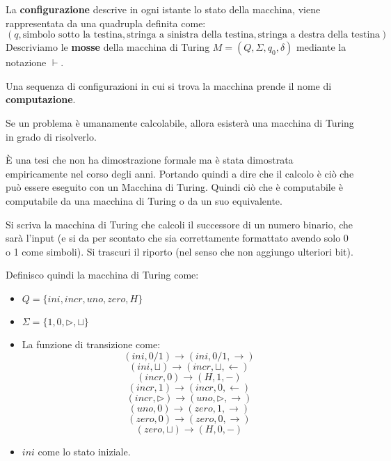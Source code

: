La \textbf{configurazione} descrive in ogni istante lo stato della macchina, viene rappresentata da una quadrupla definita come:
\begin{equation}
    (q, \text{simbolo sotto la testina}, \text{stringa a sinistra della testina}, \text{stringa a destra della testina})
\end{equation}
Descriviamo le \textbf{mosse} della macchina di Turing $M = (Q, \Sigma, q_0, \delta)$ mediante la notazione $\vdash$. 
\begin{definizione}
    Una sequenza di configurazioni in cui si trova la macchina prende il nome di \textbf{computazione}.
\end{definizione}
\begin{teorema}
    Se un problema è umanamente calcolabile, allora esisterà una macchina di Turing in grado di risolverlo.
\end{teorema}
È una tesi che non ha dimostrazione formale ma è stata dimostrata empiricamente nel corso degli anni. Portando quindi a dire che il calcolo è ciò che può essere eseguito con un Macchina di Turing. Quindi ciò che è computabile è computabile da una macchina di Turing o da un suo equivalente.

\begin{esempio} 
    Si scriva la macchina di Turing che calcoli il successore di un numero binario, che sarà l'input (e si da per scontato che sia correttamente formattato avendo solo 0 o 1 come simboli). Si trascuri il riporto (nel senso che non aggiungo ulteriori bit).
    
    Definisco quindi la macchina di Turing come:
    \begin{itemize}
        \item $Q = \{ini, incr, uno, zero, H\}$
        \item $\Sigma = \{1, 0, \triangleright, \sqcup\}$
        \item La funzione di transizione come: 
        $$(ini, 0 / 1) \to (ini, 0 / 1, \to)$$ 
        $$(ini, \sqcup) \to (incr, \sqcup, \gets)$$ 
        $$(incr, 0) \to (H, 1, -)$$ 
        $$(incr, 1) \to (incr, 0, \gets)$$ 
        $$(incr, \triangleright) \to (uno, \triangleright, \to)$$ 
        $$(uno, 0) \to (zero, 1, \to)$$
        $$(zero, 0) \to (zero, 0, \to)$$
        $$(zero, \sqcup) \to (H, 0, -)$$
        \item $ini$ come lo stato iniziale.
    \end{itemize}
\end{esempio}

